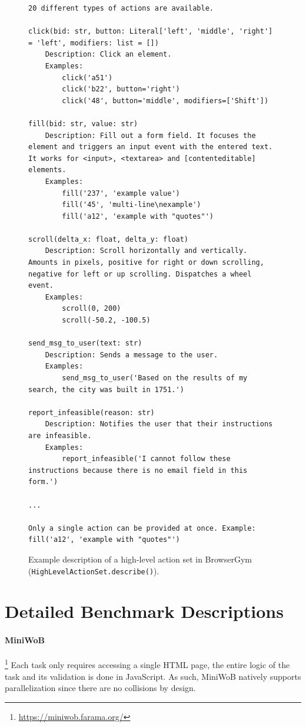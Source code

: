 \documentclass[10pt]{article} %
\begin{document}
\begin{figure}[ht]
    \centering
    \begin{verbatim}
20 different types of actions are available.

click(bid: str, button: Literal['left', 'middle', 'right'] = 'left', modifiers: list = [])
    Description: Click an element.
    Examples:
        click('a51')
        click('b22', button='right')
        click('48', button='middle', modifiers=['Shift'])

fill(bid: str, value: str)
    Description: Fill out a form field. It focuses the element and triggers an input event with the entered text. It works for <input>, <textarea> and [contenteditable] elements.
    Examples:
        fill('237', 'example value')
        fill('45', 'multi-line\nexample')
        fill('a12', 'example with "quotes"')

scroll(delta_x: float, delta_y: float)
    Description: Scroll horizontally and vertically. Amounts in pixels, positive for right or down scrolling, negative for left or up scrolling. Dispatches a wheel event.
    Examples:
        scroll(0, 200)
        scroll(-50.2, -100.5)

send_msg_to_user(text: str)
    Description: Sends a message to the user.
    Examples:
        send_msg_to_user('Based on the results of my search, the city was built in 1751.')

report_infeasible(reason: str)
    Description: Notifies the user that their instructions are infeasible.
    Examples:
        report_infeasible('I cannot follow these instructions because there is no email field in this form.')

...

Only a single action can be provided at once. Example:
fill('a12', 'example with "quotes"')
    \end{verbatim}

    \caption{Example description of a high-level action set in BrowserGym (\texttt{HighLevelActionSet.describe()}).}
    \label{fig:actionset-description}
\end{figure}

\clearpage
\section{Detailed Benchmark Descriptions}
\label{app:benchmarks}

\paragraph{MiniWoB}\footnote{\url{https://miniwob.farama.org/}} \citep{world-of-bits, Miniwob_plusplus} Each task only requires accessing a single HTML page, the entire logic of the task and its validation is done in JavaScript. As such, MiniWoB natively supports parallelization since there are no collisions by design.
\end{document}
